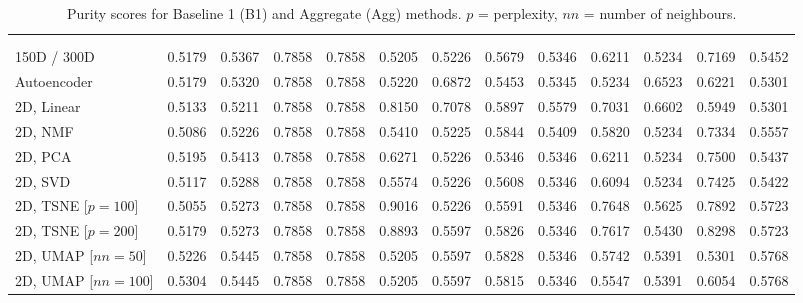 \begin{table}
\begin{tabular}{ >{\raggedright}p{2cm} *{12}{c} }
\toprule
{} &  &  &  &  &  &  \\
\cmidrule(lr){2-3} \cmidrule(lr){4-5} \cmidrule(lr){6-7} \cmidrule(lr){8-9} \cmidrule(lr){10-11} \cmidrule(lr){12-13} &
 &  &  &  &  &  &  &  &  &  &  &  \\

\midrule
150D / 300D           & 0.5179 & 0.5367 & 0.7858 & 0.7858 & 0.5205 & 0.5226 & 0.5679 & 0.5346 & 0.6211 & 0.5234 & 0.7169 & 0.5452 \\
Autoencoder           & 0.5179 & 0.5320 & 0.7858 & 0.7858 & 0.5220 & 0.6872 & 0.5453 & 0.5345 & 0.5234 & 0.6523 & 0.6221 & 0.5301 \\
2D, Linear            & 0.5133 & 0.5211 & 0.7858 & 0.7858 & 0.8150 & 0.7078 & 0.5897 & 0.5579 & 0.7031 & 0.6602 & 0.5949 & 0.5301 \\
2D, NMF               & 0.5086 & 0.5226 & 0.7858 & 0.7858 & 0.5410 & 0.5225 & 0.5844 & 0.5409 & 0.5820 & 0.5234 & 0.7334 & 0.5557 \\
2D, PCA               & 0.5195 & 0.5413 & 0.7858 & 0.7858 & 0.6271 & 0.5226 & 0.5346 & 0.5346 & 0.6211 & 0.5234 & 0.7500 & 0.5437 \\
2D, SVD               & 0.5117 & 0.5288 & 0.7858 & 0.7858 & 0.5574 & 0.5226 & 0.5608 & 0.5346 & 0.6094 & 0.5234 & 0.7425 & 0.5422 \\
2D, TSNE [$p=100$]    & 0.5055 & 0.5273 & 0.7858 & 0.7858 & 0.9016 & 0.5226 & 0.5591 & 0.5346 & 0.7648 & 0.5625 & 0.7892 & 0.5723 \\
2D, TSNE [$p=200$]    & 0.5179 & 0.5273 & 0.7858 & 0.7858 & 0.8893 & 0.5597 & 0.5826 & 0.5346 & 0.7617 & 0.5430 & 0.8298 & 0.5723 \\
2D, UMAP [$nn=50$]    & 0.5226 & 0.5445 & 0.7858 & 0.7858 & 0.5205 & 0.5597 & 0.5828 & 0.5346 & 0.5742 & 0.5391 & 0.5301 & 0.5768 \\
2D, UMAP [$nn=100$]   & 0.5304 & 0.5445 & 0.7858 & 0.7858 & 0.5205 & 0.5597 & 0.5815 & 0.5346 & 0.5547 & 0.5391 & 0.6054 & 0.5768 \\
\bottomrule
\end{tabular}
\caption{Purity scores for Baseline 1 (B1) and Aggregate (Agg) methods. $p$ = perplexity, $nn$ = number of neighbours.}
\label{tab:5-purity-b1}
\end{table}
\FloatBarrier


